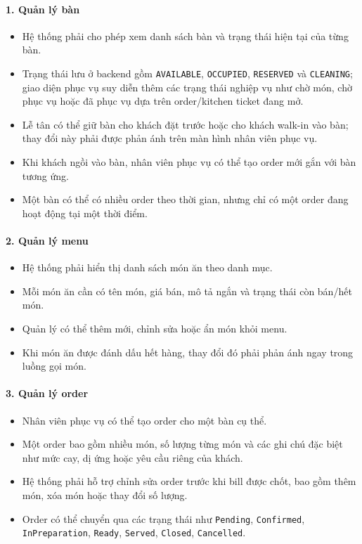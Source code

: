 \documentclass[12pt,a4paper]{article}
\begin{document}
\paragraph{1. Quản lý bàn}
\begin{itemize}
    \item Hệ thống phải cho phép xem danh sách bàn và trạng thái hiện tại của từng bàn.
    \item Trạng thái lưu ở backend gồm \texttt{AVAILABLE}, \texttt{OCCUPIED}, \texttt{RESERVED} và \texttt{CLEANING}; giao diện phục vụ suy diễn thêm các trạng thái nghiệp vụ như chờ món, chờ phục vụ hoặc đã phục vụ dựa trên order/kitchen ticket đang mở.
    \item Lễ tân có thể giữ bàn cho khách đặt trước hoặc cho khách walk-in vào bàn; thay đổi này phải được phản ánh trên màn hình nhân viên phục vụ.
    \item Khi khách ngồi vào bàn, nhân viên phục vụ có thể tạo order mới gắn với bàn tương ứng.
    \item Một bàn có thể có nhiều order theo thời gian, nhưng chỉ có một order đang hoạt động tại một thời điểm.
\end{itemize}

\paragraph{2. Quản lý menu}
\begin{itemize}
    \item Hệ thống phải hiển thị danh sách món ăn theo danh mục.
    \item Mỗi món ăn cần có tên món, giá bán, mô tả ngắn và trạng thái còn bán/hết món.
    \item Quản lý có thể thêm mới, chỉnh sửa hoặc ẩn món khỏi menu.
    \item Khi món ăn được đánh dấu hết hàng, thay đổi đó phải phản ánh ngay trong luồng gọi món.
\end{itemize}

\paragraph{3. Quản lý order}
\begin{itemize}
    \item Nhân viên phục vụ có thể tạo order cho một bàn cụ thể.
    \item Một order bao gồm nhiều món, số lượng từng món và các ghi chú đặc biệt như mức cay, dị ứng hoặc yêu cầu riêng của khách.
    \item Hệ thống phải hỗ trợ chỉnh sửa order trước khi bill được chốt, bao gồm thêm món, xóa món hoặc thay đổi số lượng.
    \item Order có thể chuyển qua các trạng thái như \texttt{Pending}, \texttt{Confirmed}, \texttt{InPreparation}, \texttt{Ready}, \texttt{Served}, \texttt{Closed}, \texttt{Cancelled}.
\end{itemize}
\end{document}
